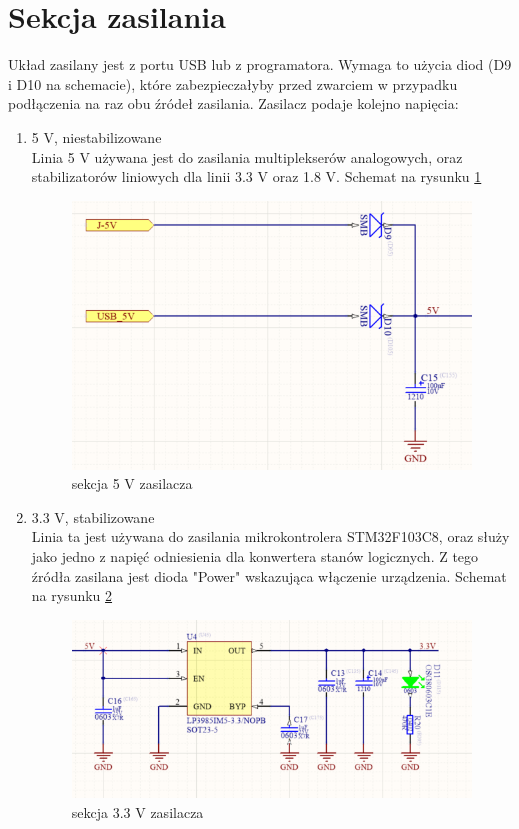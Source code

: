 \section{Sekcja zasilania}
Układ zasilany jest z portu USB lub z programatora. Wymaga to użycia diod (D9 i D10 na schemacie), które zabezpieczałyby przed zwarciem w przypadku podłączenia na raz obu źródeł zasilania. Zasilacz podaje kolejno napięcia:
\begin{enumerate}
    \item 5 V, niestabilizowane\\
    Linia 5 V używana jest do zasilania multiplekserów analogowych, oraz stabilizatorów liniowych dla linii 3.3 V oraz 1.8 V. Schemat na rysunku \ref{5V_power_supply}
    \begin{figure}[H]
    \centering
    \includegraphics[width=0.35\paperwidth]{images/5V_supply.png}
    \caption{sekcja 5 V zasilacza}
    \label{5V_power_supply}
    \end{figure}

    \item 3.3 V, stabilizowane \\
    Linia ta jest używana do zasilania mikrokontrolera STM32F103C8, oraz służy jako jedno z napięć odniesienia dla konwertera stanów logicznych. Z tego źródła zasilana jest dioda "Power" wskazująca włączenie urządzenia.
    Schemat na rysunku \ref{3.3V_power_supply}
    
    \begin{figure}[H]
    \centering
    \includegraphics[width=0.55\paperwidth]{images/3,3V_supply.png}
    \caption{sekcja 3.3 V zasilacza}
    \label{3.3V_power_supply}
    \end{figure}
    

\end{enumerate}
